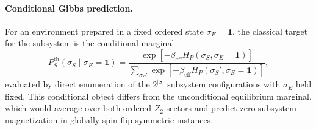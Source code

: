 \paragraph{Conditional Gibbs prediction.}
For an environment prepared in a fixed ordered state $\sigma_E=\mathbf{1}$, the classical target for the subsystem is the conditional marginal
\begin{equation}
    P_S^\mathrm{th}(\sigma_S \mid \sigma_E = \mathbf{1})
    =
    \frac{\exp[-\beta_\mathrm{eff} H_P(\sigma_S,\sigma_E=\mathbf{1})]}
         {\sum_{\sigma_S'}\exp[-\beta_\mathrm{eff} H_P(\sigma_S',\sigma_E=\mathbf{1})]},
    \label{eq:cond_gibbs}
\end{equation}
evaluated by direct enumeration of the $2^{|S|}$ subsystem configurations with $\sigma_E$ held fixed.
This conditional object differs from the unconditional equilibrium marginal, which would average over both ordered $Z_2$ sectors and predict zero subsystem magnetization in globally spin-flip-symmetric instances.

